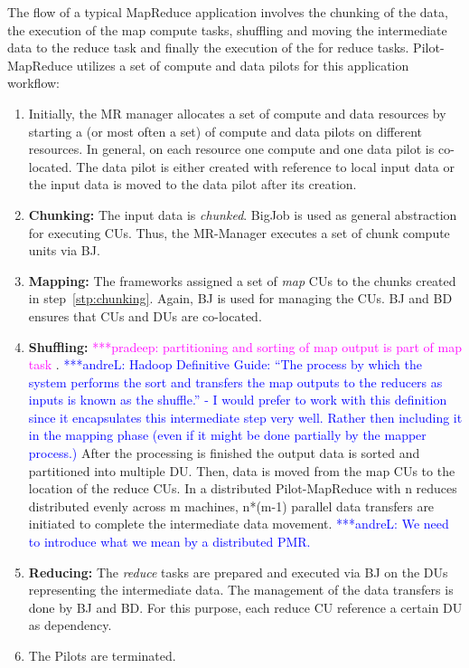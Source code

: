 \documentclass{acm_proc_article-sp}
\newcommand{\alnote}[1]{ {\textcolor{blue} { ***andreL: #1 }}}
\newcommand{\pnote}[1]{ {\textcolor{magenta} { ***pradeep: #1 }}}
\newcommand{\alnote}[1]{}
\newcommand{\pnote}[1]{}
\newcommand{\pilots}{Pilots\xspace}
\newcommand{\pilotmapreduce}{Pilot-MapReduce\xspace}
\begin{document}
The flow of a typical MapReduce application involves the chunking of the data,
the execution of the map compute tasks, shuffling and moving the intermediate
data to the reduce task and finally the execution of the for reduce tasks.
Pilot-MapReduce utilizes a set of compute and data pilots for this application
workflow:
\begin{enumerate}
	\item Initially, the MR manager allocates a set of compute and data 
	resources by starting a (or most often a set) of compute and data pilots 
	on different resources. In general, on each resource one compute 
	and one data pilot is co-located. The data pilot is either created with 
	reference to local input data or the input data is moved to the data pilot 
	after its creation. 

	\item \textbf{Chunking:} The input data is {\it chunked}. BigJob is used 
	as general abstraction for executing CUs. Thus, the MR-Manager executes a set of 
	chunk compute units via BJ. \label{stp:chunking}
	
	\item \textbf{Mapping:} The frameworks assigned a set of {\it map} CUs to 
	the chunks created in step~\ref{stp:chunking}. Again, BJ is used for managing the CUs. 
	BJ and BD ensures that CUs and DUs are co-located.
	
	\item \textbf{Shuffling:} \pnote{partitioning and sorting of 
        map output is part of map task}. \alnote{Hadoop Definitive Guide: ``The process by 
		which the system performs the sort and transfers the map outputs to the reducers as 
		inputs is known as the shuffle.'' - I would prefer to work with this definition 
		since it encapsulates this intermediate step very well. Rather then including it in 
		the mapping phase (even if it might be done partially by the mapper process.) }  
		After the processing is finished the output data is sorted and partitioned into 
		multiple DU. Then, data is moved from the map CUs to the location of the reduce 
		CUs. In a distributed 
		\pilotmapreduce with n reduces distributed evenly across m machines, n*(m-1) 
		parallel data transfers are initiated to complete the intermediate data movement. 
		\alnote{We need to introduce what we mean by a distributed PMR.}
	
	\item \textbf{Reducing:} The {\it reduce} tasks are prepared and 
	executed via BJ on the DUs representing the intermediate data. The 
	management of the data transfers is done by BJ and BD. For this purpose, 
	each reduce CU reference a certain DU as dependency.
	
	\item The \pilots are terminated.

\end{enumerate}
\end{document}
